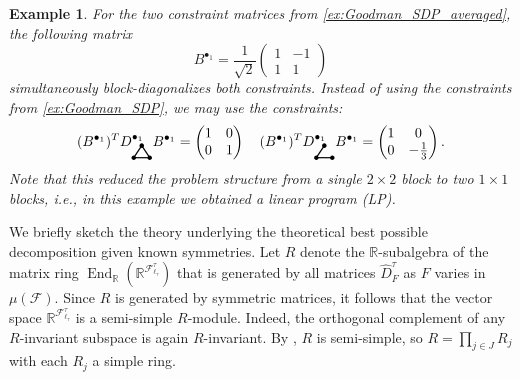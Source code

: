 \documentclass[a4paper,11pt]{article}
\newtheorem{example}[theorem]{Example}
\numberwithin{equation}{section}
\newcommand{\mF}{\mathcal{F}}
\newcommand{\RR}{\mathbb{R}}
\begin{document}
\begin{example}\label{ex:concrete_base_change}
    For the two constraint matrices from \cref{ex:Goodman_SDP_averaged}, the following matrix
    \[
        B^{\bullet_1} = \frac{1}{\sqrt{2}}
        \begin{pmatrix}
            1 & -1 \\
            1 & 1
        \end{pmatrix}
    \]
    simultaneously block-diagonalizes both constraints. Instead of using the constraints from \cref{ex:Goodman_SDP}, we may use the constraints:
    \[
        (B^{\bullet_1})^T
        D^{\bullet_1}_{\begin{tikzpicture}[line width=0.3mm, baseline=0ex,
        scale = 0.4]
            \draw [black] (0,0) -- (1,0);
            \draw [black] (0,0) -- (0.5,0.75);
            \draw [black] (0.5,0.75) -- (1,0);
            \fill [black] (0,0) circle (4pt);
            \fill [black] (1,0) circle (4pt);
            \fill [black] (0.5,0.75) circle (4pt);
        \end{tikzpicture}}
        B^{\bullet_1}
        =
        \begin{pmatrix}
            1 & 0 \\
            0 & 1
        \end{pmatrix}
        \quad
        (B^{\bullet_1})^T
        D^{\bullet_1}_{\begin{tikzpicture}[line width=0.3mm, baseline=0ex,
        scale = 0.4]
            \draw [black] (0,0) -- (1,0);
            \draw [black] (0,0) -- (0.5,0.75);
            \fill [black] (0,0) circle (4pt);
            \fill [black] (1,0) circle (4pt);
            \fill [black] (0.5,0.75) circle (4pt);
        \end{tikzpicture}}
        B^{\bullet_1}
        =
        \begin{pmatrix}
            1 & 0 \\
            0 & -\frac{1}{3}
        \end{pmatrix}.
    \] 
    Note that this reduced the problem structure from a single $2 \times 2$ block to two $1 \times 1$ blocks, i.e., in this example we obtained a linear program (LP).
\end{example}

We briefly sketch the theory underlying the theoretical best possible decomposition given known symmetries.
Let $R$ denote the $\mathbb R$-subalgebra of the matrix ring $\operatorname{End}_{\mathbb R}(\RR^{\mF^\tau_{\ell_\tau}})$ that is generated by all matrices $\hat D^\tau_F$ as $F$ varies in $\mu(\mF)$. Since $R$ is generated by symmetric matrices, it follows that the vector space $\mathbb R^{\mF^\tau_{\ell_\tau}}$ is a semi-simple $R$-module. Indeed, the orthogonal complement of any $R$-invariant subspace is again $R$-invariant. By \cite[pp. 654, Proposition 4.7]{SergeLang2002}, $R$ is semi-simple, so $R = \prod_{j\in J} R_j$ with each $R_j$ a simple ring.
\end{document}
